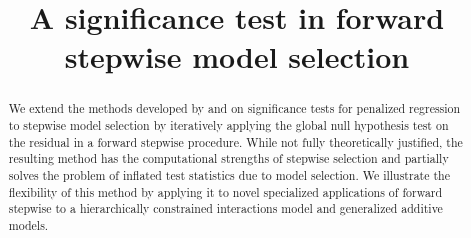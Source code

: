 \documentclass{imsart}
\begin{document}
\begin{frontmatter}

\title{A significance test in forward stepwise model selection}




\address{Department of Statistics\\  Stanford University\\ Sequoia
Hall \\390 Serra Mall\\ Stanford, CA 94305, U.S.A.\\ }


\begin{abstract}
  We extend the methods developed by \cite{significance:lasso} and
  \cite{tests:adaptive} on significance tests for penalized
  regression to stepwise model selection by iteratively applying
  the global null hypothesis test on the residual in a forward stepwise
  procedure. While not fully theoretically justified, the resulting method
  has the computational strengths of stepwise selection and partially
  solves the problem of inflated test statistics due to model selection.
  We illustrate the flexibility of this method by applying it to
  novel specialized applications of forward stepwise to a hierarchically
  constrained interactions model and generalized additive models.
\end{abstract}

\begin{keyword}[class=AMS]
\end{keyword}

\begin{keyword}
\end{keyword}

\end{frontmatter}
\end{document}
